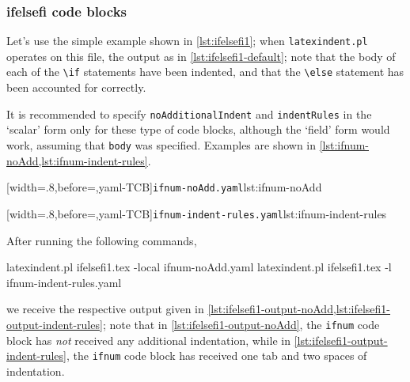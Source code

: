 \subsubsection{ifelsefi code blocks}
 Let's use the simple example shown in \cref{lst:ifelsefi1}; when \texttt{latexindent.pl}
 operates on this file, the output as in \cref{lst:ifelsefi1-default}; note that the body
 of each of the \lstinline!\if! statements have been indented, and that the
 \lstinline!\else! statement has been accounted for correctly.

 \begin{minipage}{.45\textwidth}
 \end{minipage}%
 \hfill
 \begin{minipage}{.54\textwidth}
 \end{minipage}

 It is recommended to specify \texttt{noAdditionalIndent} and \texttt{indentRules} in the
 `scalar' form only for these type of code blocks, although the `field' form would work,
 assuming that \texttt{body} was specified. Examples are shown in
 \cref{lst:ifnum-noAdd,lst:ifnum-indent-rules}.

 \begin{minipage}{.45\textwidth}
  [width=.8\linewidth,before=\centering,yaml-TCB]{\texttt{ifnum-noAdd.yaml}}{lst:ifnum-noAdd}
 \end{minipage}
 \hfill
 \begin{minipage}{.45\textwidth}
  [width=.8\linewidth,before=\centering,yaml-TCB]{\texttt{ifnum-indent-rules.yaml}}{lst:ifnum-indent-rules}
 \end{minipage}

 After running the following commands, 
 \begin{commandshell}
latexindent.pl ifelsefi1.tex -local ifnum-noAdd.yaml  
latexindent.pl ifelsefi1.tex -l ifnum-indent-rules.yaml  
\end{commandshell}
 we receive the respective output given in
 \cref{lst:ifelsefi1-output-noAdd,lst:ifelsefi1-output-indent-rules}; note that in
 \cref{lst:ifelsefi1-output-noAdd}, the \texttt{ifnum} code block has \emph{not} received
 any additional indentation, while in \cref{lst:ifelsefi1-output-indent-rules}, the
 \texttt{ifnum} code block has received one tab and two spaces of indentation.

